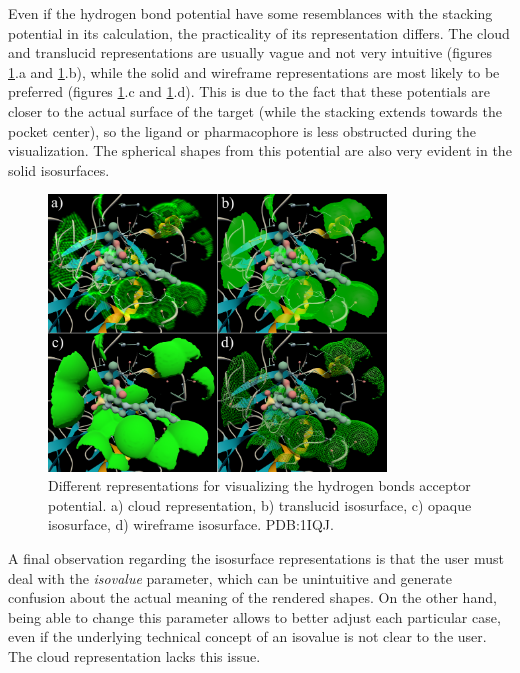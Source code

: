     Even if the hydrogen bond potential have some resemblances with the stacking potential in its calculation, the practicality of its representation differs. The cloud and translucid representations are usually vague and not very intuitive (figures \ref{fig:results/reprs_2}.a and \ref{fig:results/reprs_2}.b), while the solid and wireframe representations are most likely to be preferred (figures \ref{fig:results/reprs_2}.c and \ref{fig:results/reprs_2}.d). This is due to the fact that these potentials are closer to the actual surface of the target (while the stacking extends towards the pocket center), so the ligand or pharmacophore is less obstructed during the visualization. The spherical shapes from this potential are also very evident in the solid isosurfaces.

    \begin{figure}[H]
      \centering
      \includegraphics[width=0.8\textwidth]{figures/results/reprs_2.png}
      \caption{\label{fig:results/reprs_2} Different representations for visualizing the hydrogen bonds acceptor potential. a) cloud representation, b) translucid isosurface, c) opaque isosurface, d) wireframe isosurface. PDB:1IQJ.}
    \end{figure}

    A final observation regarding the isosurface representations is that the user must deal with the \textit{isovalue} parameter, which can be unintuitive and generate confusion about the actual meaning of the rendered shapes. On the other hand, being able to change this parameter allows to better adjust each particular case, even if the underlying technical concept of an isovalue is not clear to the user. The cloud representation lacks this issue.


